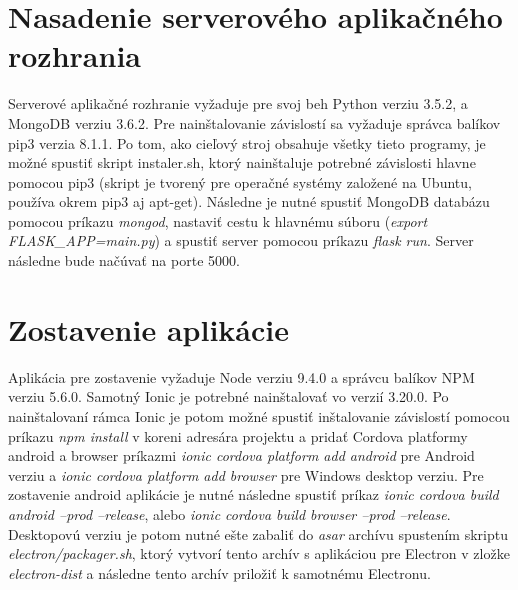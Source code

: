 \section{Nasadenie serverového aplikačného rozhrania}
Serverové aplikačné rozhranie vyžaduje pre svoj beh Python verziu 3.5.2, a MongoDB verziu 3.6.2. Pre nainštalovanie závislostí sa vyžaduje správca balíkov pip3 verzia 8.1.1. Po tom, ako cieľový stroj obsahuje všetky tieto programy, je možné spustiť skript instaler.sh, ktorý nainštaluje potrebné závislosti hlavne pomocou pip3 (skript je tvorený pre operačné systémy založené na Ubuntu, používa okrem pip3 aj apt-get). Následne je nutné spustiť MongoDB databázu pomocou príkazu \textit{mongod}, nastaviť cestu k hlavnému súboru (\textit{export FLASK\_APP=main.py}) a spustiť server pomocou príkazu \textit{flask run}. Server následne bude načúvať na porte 5000. 

\section{Zostavenie aplikácie}
Aplikácia pre zostavenie vyžaduje Node verziu 9.4.0 a správcu balíkov NPM verziu 5.6.0. Samotný Ionic je potrebné nainštalovať vo verzií 3.20.0. Po nainštalovaní rámca Ionic je potom možné spustiť inštalovanie závislostí pomocou príkazu \textit{npm install} v koreni adresára projektu a pridať Cordova platformy android a browser príkazmi \textit{ionic cordova platform add android} pre Android verziu a \textit{ionic cordova platform add browser} pre Windows desktop verziu. Pre zostavenie android aplikácie je nutné následne spustiť príkaz \textit{ionic cordova build android --prod --release}, alebo \textit{ionic cordova build browser --prod --release}. Desktopovú verziu je potom nutné ešte zabaliť do \textit{asar} archívu spustením skriptu \textit{electron/packager.sh}, ktorý vytvorí tento archív s aplikáciou pre Electron v zložke \textit{electron-dist} a následne tento archív priložiť k samotnému Electronu.


